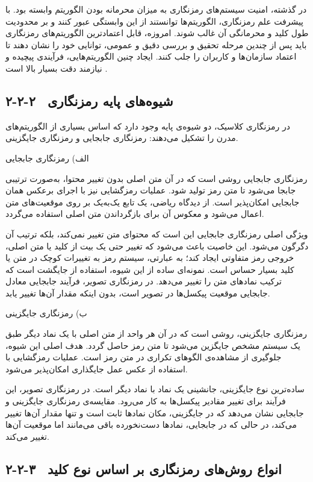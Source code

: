 در گذشته، امنیت سیستم‌های رمزنگاری به میزان محرمانه بودن الگوریتم وابسته بود. با پیشرفت علم رمزنگاری، الگوریتم‌ها توانستند از این وابستگی عبور کنند و بر محدودیت طول کلید و محرمانگی آن غالب شوند. امروزه، قابل اعتمادترین الگوریتم‌های رمزنگاری باید پس از چندین مرحله تحقیق و بررسی دقیق و عمومی، توانایی خود را نشان دهند تا اعتماد سازمان‌ها و کاربران را جلب کنند. ایجاد چنین الگوریتم‌هایی، فرآیندی پیچیده و نیازمند دقت بسیار بالا است \cite{ref21}.

\subsection{۲-۲-۲  شیوه‌های پایه رمزنگاری}

در رمزنگاری کلاسیک، دو شیوه‌ی پایه وجود دارد که اساس بسیاری از الگوریتم‌های مدرن را تشکیل می‌دهند: رمزنگاری جابجایی و رمزنگاری جایگزینی\cite{ref22}.

الف) رمزنگاری جابجایی

رمزنگاری جابجایی روشی است که در آن متن اصلی بدون تغییر محتوا، به‌صورت ترتیبی جابجا می‌شود تا متن رمز تولید شود. عملیات رمزگشایی نیز با اجرای برعکس همان جابجایی امکان‌پذیر است. از دیدگاه ریاضی، یک تابع یک‌به‌یک بر روی موقعیت‌های متن اعمال می‌شود و معکوس آن برای بازگرداندن متن اصلی استفاده می‌گردد.

ویژگی اصلی رمزنگاری جابجایی این است که محتوای متن تغییر نمی‌کند، بلکه ترتیب آن دگرگون می‌شود. این خاصیت باعث می‌شود که تغییر حتی یک بیت از کلید یا متن اصلی، خروجی رمز متفاوتی ایجاد کند؛ به عبارتی، سیستم رمز به تغییرات کوچک در متن یا کلید بسیار حساس است. نمونه‌ای ساده از این شیوه، استفاده از جایگشت  است که ترکیب نمادهای متن را تغییر می‌دهد. در رمزنگاری تصویر، فرآیند جابجایی معادل جابجایی موقعیت پیکسل‌ها در تصویر است، بدون اینکه مقدار آن‌ها تغییر یابد\cite{ref23}.

ب) رمزنگاری جایگزینی

رمزنگاری جایگزینی، روشی است که در آن هر واحد از متن اصلی با یک نماد دیگر طبق یک سیستم مشخص جایگزین می‌شود تا متن رمز حاصل گردد. هدف اصلی این شیوه، جلوگیری از مشاهده‌ی الگوهای تکراری در متن رمز است. عملیات رمزگشایی با استفاده از عکس عمل جایگذاری امکان‌پذیر می‌شود.

ساده‌ترین نوع جایگزینی، جانشینی یک نماد با نماد دیگر است. در رمزنگاری تصویر، این فرآیند برای تغییر مقادیر پیکسل‌ها به کار می‌رود. مقایسه‌ی رمزنگاری جایگزینی و جابجایی نشان می‌دهد که در جایگزینی، مکان نمادها ثابت است و تنها مقدار آن‌ها تغییر می‌کند، در حالی که در جابجایی، نمادها دست‌نخورده باقی می‌مانند اما موقعیت آن‌ها تغییر می‌کند\cite{ref22, ref24}.

\subsection{۲-۲-۳  انواع روش‌های رمزنگاری بر اساس نوع کلید}

